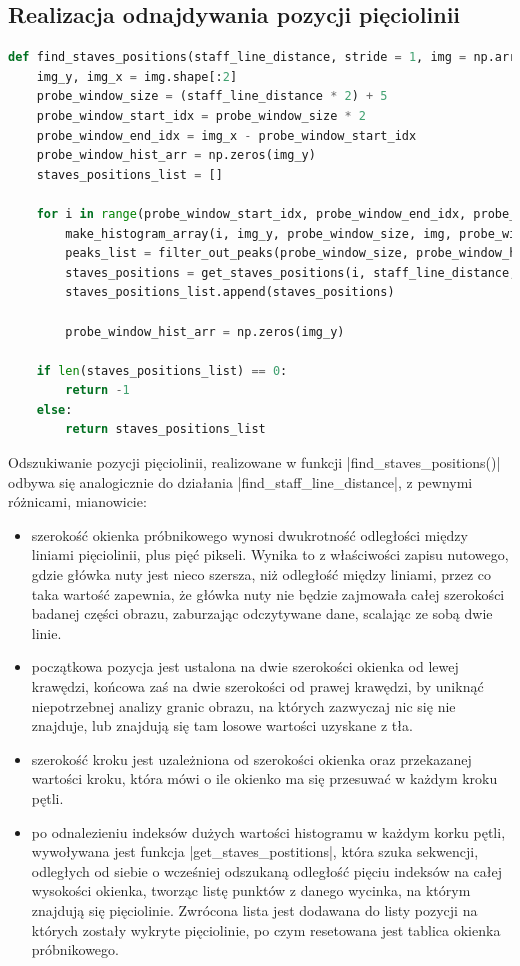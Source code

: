 \subsection{Realizacja odnajdywania pozycji pięciolinii}

\begin{lstlisting}[caption={\pyth|find_staves_positions()| - funkcja odnajdywania pozycji pięciolinii.}, label={find-staves-positions}, language=Python]
def find_staves_positions(staff_line_distance, stride = 1, img = np.array):
	img_y, img_x = img.shape[:2]
	probe_window_size = (staff_line_distance * 2) + 5
	probe_window_start_idx = probe_window_size * 2
	probe_window_end_idx = img_x - probe_window_start_idx
	probe_window_hist_arr = np.zeros(img_y)
	staves_positions_list = []
	
	for i in range(probe_window_start_idx, probe_window_end_idx, probe_window_size * stride):
		make_histogram_array(i, img_y, probe_window_size, img, probe_window_hist_arr)
		peaks_list = filter_out_peaks(probe_window_size, probe_window_hist_arr)
		staves_positions = get_staves_positions(i, staff_line_distance, peaks_list)
		staves_positions_list.append(staves_positions)
		
		probe_window_hist_arr = np.zeros(img_y)
	
	if len(staves_positions_list) == 0:
		return -1
	else:
		return staves_positions_list
\end{lstlisting}

Odszukiwanie pozycji pięciolinii, realizowane w funkcji \pyth|find_staves_positions()| odbywa się analogicznie do działania \pyth|find_staff_line_distance|, z pewnymi różnicami, mianowicie:
\begin{itemize}
	\item szerokość okienka próbnikowego wynosi dwukrotność odległości między liniami pięciolinii, plus pięć pikseli. Wynika to z właściwości zapisu nutowego, gdzie główka nuty jest nieco szersza, niż odległość między liniami, przez co taka wartość zapewnia, że główka nuty nie będzie zajmowała całej szerokości badanej części obrazu, zaburzając odczytywane dane, scalając ze sobą dwie linie.
	\item początkowa pozycja jest ustalona na dwie szerokości okienka od lewej krawędzi, końcowa zaś na dwie szerokości od prawej krawędzi, by uniknąć niepotrzebnej analizy granic obrazu, na których zazwyczaj nic się nie znajduje, lub znajdują się tam losowe wartości uzyskane z tła.
	\item szerokość kroku jest uzależniona od szerokości okienka oraz przekazanej wartości kroku, która mówi o ile okienko ma się przesuwać w każdym kroku pętli.
	\item po odnalezieniu indeksów dużych wartości histogramu w każdym korku pętli, wywoływana jest funkcja \pyth|get_staves_postitions|, która szuka sekwencji, odległych od siebie o wcześniej odszukaną odległość pięciu indeksów na całej wysokości okienka, tworząc listę punktów z danego wycinka, na którym znajdują się pięciolinie. Zwrócona lista jest dodawana do listy pozycji na których zostały wykryte pięciolinie, po czym resetowana jest tablica okienka próbnikowego.
\end{itemize}


